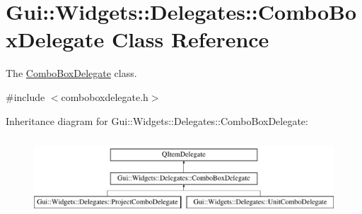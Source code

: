 \hypertarget{classGui_1_1Widgets_1_1Delegates_1_1ComboBoxDelegate}{}\section{Gui\+:\+:Widgets\+:\+:Delegates\+:\+:Combo\+Box\+Delegate Class Reference}
\label{classGui_1_1Widgets_1_1Delegates_1_1ComboBoxDelegate}


The \hyperlink{classGui_1_1Widgets_1_1Delegates_1_1ComboBoxDelegate}{Combo\+Box\+Delegate} class.  




{\ttfamily \#include $<$comboboxdelegate.\+h$>$}

Inheritance diagram for Gui\+:\+:Widgets\+:\+:Delegates\+:\+:Combo\+Box\+Delegate\+:\begin{figure}[H]
\begin{center}
\leavevmode
\includegraphics[height=2.937063cm]{d5/d72/classGui_1_1Widgets_1_1Delegates_1_1ComboBoxDelegate}
\end{center}
\end{figure}
